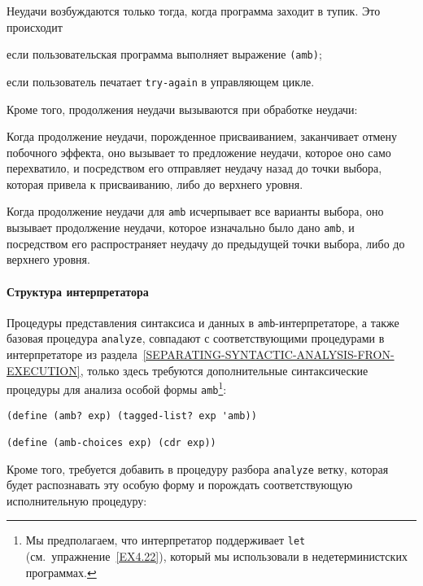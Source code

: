 Неудачи возбуждаются только тогда, когда программа
заходит в тупик.  Это происходит

\begin{plainlist}
\item
если пользовательская программа выполняет выражение
{\tt (amb)};

\item
если пользователь печатает {\tt try-again} в
управляющем цикле.
\end{plainlist}

Кроме того, продолжения неудачи вызываются при обработке
неудачи:

\begin{plainlist}
\item
Когда продолжение неудачи, порожденное
присваиванием, заканчивает отмену побочного эффекта, оно вызывает то
предложение неудачи, которое оно само перехватило, и посредством его
отправляет неудачу назад до точки выбора, которая привела к
присваиванию, либо до верхнего уровня.

\item
Когда продолжение неудачи для {\tt amb}
исчерпывает все варианты выбора, оно вызывает продолжение
неудачи, которое изначально было дано {\tt amb}, и посредством его
распространяет неудачу до предыдущей точки выбора, либо до верхнего
уровня.
\end{plainlist}

\paragraph{Структура интерпретатора}

Процедуры представления синтаксиса и данных в
{\tt amb}-интерпретаторе, а также базовая процедура
{\tt analyze}, совпадают с соответствующими процедурами в интерпретаторе из
раздела~\ref{SEPARATING-SYNTACTIC-ANALYSIS-FRON-EXECUTION},
только здесь требуются дополнительные синтаксические процедуры для
анализа особой формы {\tt amb}\footnote{Мы предполагаем, что 
интерпретатор поддерживает
{\tt let} (см.~упражнение~\ref{EX4.22}), который мы
использовали в недетерминистских программах.}:

\begin{Verbatim}[fontsize=\small]
(define (amb? exp) (tagged-list? exp 'amb))

(define (amb-choices exp) (cdr exp))
\end{Verbatim}
Кроме того, требуется добавить в процедуру разбора
{\tt analyze} ветку, которая будет распознавать эту особую форму и
порождать соответствующую исполнительную процедуру:

